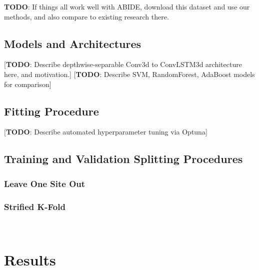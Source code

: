 \documentclass[10pt]{article}
\begin{document}
\textbf{TODO}: If things all work well with ABIDE, download this dataset and use our methods, and also
compare to existing research there.

\subsection{Models and Architectures}

[\textbf{TODO}: Describe depthwise-separable Conv3d to ConvLSTM3d architecture here, and motivation.]
[\textbf{TODO}: Describe SVM, RandomForest, AdaBoost models for comparison]

\subsection{Fitting Procedure}

[\textbf{TODO}: Describe automated hyperparameter tuning via Optuna]

\subsection{Training and Validation Splitting Procedures}

\subsubsection{Leave One Site Out}

\subsubsection{Strified K-Fold}

\

\section{Results}
\end{document}
